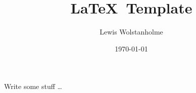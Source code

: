 \title{\LaTeX~Template}
\author{Lewis Wolstanholme}
\date{\getDate\today}
\maketitle


\noindent Write some stuff \dots